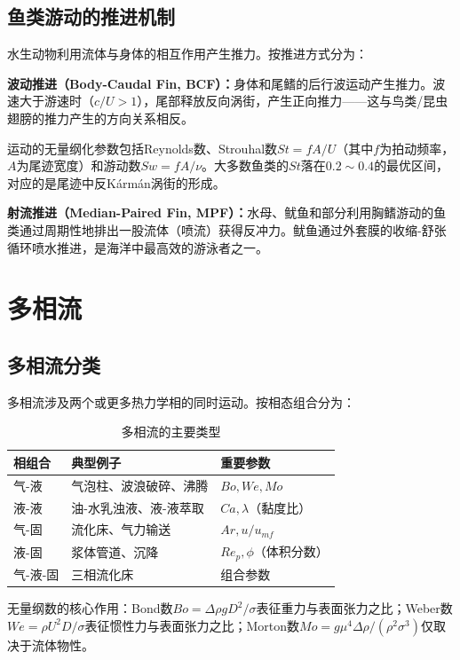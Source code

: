 \subsection{鱼类游动的推进机制}

水生动物利用流体与身体的相互作用产生推力。按推进方式分为：

\noindent\textbf{波动推进（Body-Caudal Fin, BCF）：}身体和尾鳍的后行波运动产生推力。波速大于游速时（$c/U>1$），尾部释放反向涡街，产生正向推力——这与鸟类/昆虫翅膀的推力产生的方向关系相反。

运动的无量纲化参数包括Reynolds数、Strouhal数$St = fA/U$（其中$f$为拍动频率，$A$为尾迹宽度）和游动数$Sw = fA/\nu$。大多数鱼类的$St$落在$0.2\sim 0.4$的最优区间，对应的是尾迹中反Kármán涡街的形成。

\noindent\textbf{射流推进（Median-Paired Fin, MPF）：}水母、鱿鱼和部分利用胸鳍游动的鱼类通过周期性地排出一股流体（喷流）获得反冲力。鱿鱼通过外套膜的收缩-舒张循环喷水推进，是海洋中最高效的游泳者之一。

\section{多相流}

\subsection{多相流分类}

多相流涉及两个或更多热力学相的同时运动。按相态组合分为：

\begin{table}[H]
\centering
\caption{多相流的主要类型}
\label{tab:multiphase}
\begin{tabular}{lll}
\toprule
\textbf{相组合} & \textbf{典型例子} & \textbf{重要参数} \\
\midrule
气-液 & 气泡柱、波浪破碎、沸腾 & $Bo, We, Mo$ \\
液-液 & 油-水乳浊液、液-液萃取 & $Ca, \lambda$（黏度比） \\
气-固 & 流化床、气力输送 & $Ar, u/u_{mf}$ \\
液-固 & 浆体管道、沉降 & $Re_p, \phi$（体积分数） \\
气-液-固 & 三相流化床 & 组合参数 \\
\bottomrule
\end{tabular}
\end{table}

无量纲数的核心作用：Bond数$Bo = \Delta\rho g D^{2}/\sigma$表征重力与表面张力之比；Weber数$We = \rho U^{2} D/\sigma$表征惯性力与表面张力之比；Morton数$Mo = g\mu^{4}\Delta\rho/(\rho^{2}\sigma^{3})$仅取决于流体物性。

